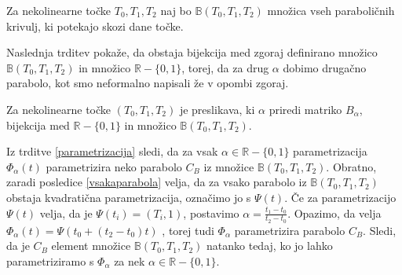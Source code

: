 \documentclass[mat1]{fmfdelo}
\newcommand{\R}{\mathbb R}
\newcommand{\B}{\mathbb B}
\newcommand{\al}{\alpha}
\begin{document}
\begin{definicija}
Za nekolinearne točke $T_0, T_1, T_2$ naj bo $\B(T_0, T_1, T_2)$ množica vseh paraboličnih krivulj, ki potekajo skozi dane točke.
\end{definicija}

Naslednja trditev pokaže, da obstaja bijekcija med zgoraj definirano množico $\B(T_0, T_1, T_2)$ in množico $\R - \{0, 1\}$, torej, da za drug $\al$ dobimo drugačno parabolo, kot smo neformalno napisali že v opombi zgoraj.

\begin{trditev}
Za nekolinearne točke $(T_0, T_1, T_2)$ je preslikava, ki $\al$ priredi matriko $B_{\al}$, bijekcija med $\R - \{0, 1\}$ in množico $\B(T_0, T_1, T_2)$.
\end{trditev}





\begin{dokaz}
Iz trditve \ref{parametrizacija} sledi, da za vsak $\al \in \R - \{0,1 \}$ parametrizacija $\Phi_\al(t)$ parametrizira neko parabolo $C_B$ iz množice $\B(T_0, T_1, T_2)$.
Obratno, zaradi posledice \ref{vsakaparabola} velja, da za vsako parabolo iz $\B(T_0, T_1, T_2)$ obstaja kvadratična parametrizacija, označimo jo s $\Psi(t)$.
Če za parametrizacijo $\Psi(t)$ velja, da je $\Psi(t_i) = (T_i, 1)$, postavimo $\al = \frac{t_1 - t_0}{t_2 - t_0}$.
Opazimo, da velja $\Phi_\al(t) = \Psi(t_0 + (t_2 - t_0)t)$ 
, torej tudi $\Phi_\al$ parametrizira parabolo $C_B$. Sledi, da je $C_B$ element množice $\B(T_0, T_1, T_2)$ natanko tedaj, ko jo lahko parametriziramo s $\Phi_\al$ za nek $\al \in \R - \{0,1 \}$.
\end{dokaz}








\end{document}

